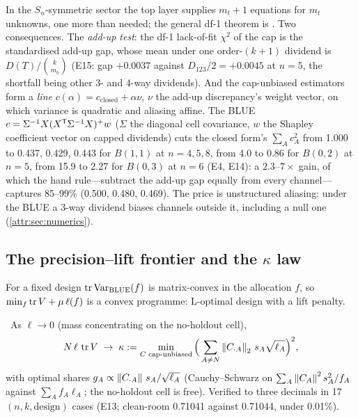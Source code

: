 In the $S_n$-symmetric sector the top layer supplies $m_t + 1$ equations for $m_t$ unknowns, one more than needed; the general df-1 theorem is . Two consequences. The \emph{add-up test}: the df-1 lack-of-fit $\chi^2$ of the cap is the standardised add-up gap, whose mean under one order-$(k+1)$ dividend is $D(T)/\binom{k}{m_b}$ (E15: gap $+0.0037$ against $D_{123}/2 = +0.0045$ at $n = 5$, the shortfall being other 3- and 4-way dividends). And the cap-unbiased estimators form a \emph{line} $c(\alpha) = c_{\mathrm{closed}} + \alpha\nu$, $\nu$ the add-up discrepancy's weight vector, on which variance is quadratic and aliasing affine. The BLUE $c = \Sigma^{-1}X(X^{\mathsf{T}}\Sigma^{-1}X)^{+}w$ ($\Sigma$ the diagonal cell covariance, $w$ the Shapley coefficient vector on capped dividends) cuts the closed form's $\sum_A c_A^2$ from 1.000 to 0.437, 0.429, 0.443 for $B(1,1)$ at $n = 4, 5, 8$, from 4.0 to 0.86 for $B(0,2)$ at $n = 5$, from 15.9 to 2.27 for $B(0,3)$ at $n = 6$ (E4, E14): a $2.3$--$7\times$ gain, of which the hand rule---subtract the add-up gap equally from every channel---captures 85--99\% (0.500, 0.480, 0.469). The price is unstructured aliasing: under the BLUE a 3-way dividend biases channels outside it, including a null one (\cref{attr:sec:numerics}).

\subsection{The precision--lift frontier and the $\kappa$ law}
\label{attr:sec:frontier}

For a fixed design $\operatorname{tr}\operatorname{Var}_{\mathrm{BLUE}}(f)$ is matrix-convex in the allocation $f$, so $\min_f \operatorname{tr} V + \mu\,\ell(f)$ is a convex programme: L-optimal design with a lift penalty.

\begin{law}
\label{attr:law:kappa}
\tagEstablished\ As $\ell \to 0$ (mass concentrating on the no-holdout cell),
\begin{equation}
N\,\ell\,\operatorname{tr} V \;\to\; \kappa := \min_{C \text{ cap-unbiased}} \Big(\sum_{A \ne N} \left\|C_{\cdot A}\right\|_2\, s_A \sqrt{\ell_A}\Big)^2,
\label{eq:attr:kappa}
\end{equation}
with optimal shares $g_A \propto \left\|C_{\cdot A}\right\|\,s_A/\sqrt{\ell_A}$ (Cauchy--Schwarz on $\sum_A \left\|C_A\right\|^2 s_A^2/f_A$ against $\sum_A f_A \ell_A$; the no-holdout cell is free). Verified to three decimals in 17 $(n, k, \text{design})$ cases (E13; clean-room 0.71041 against 0.71044, under 0.01\%).
\end{law}

